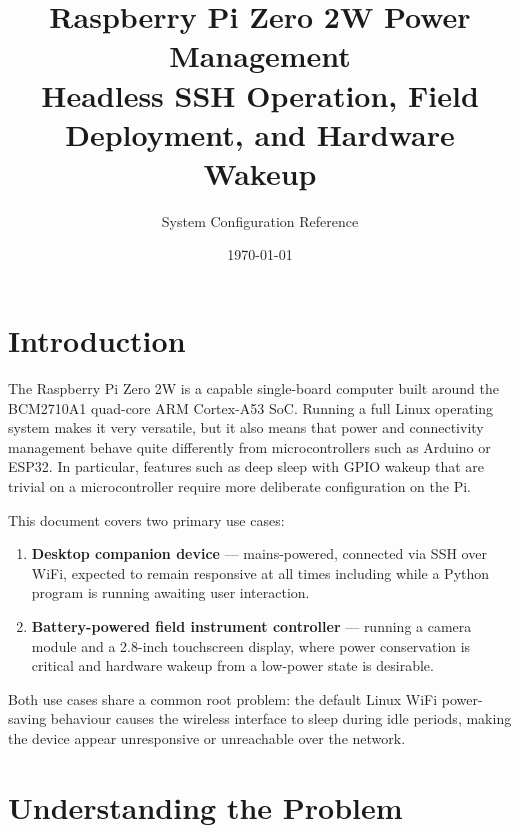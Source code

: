 \documentclass[11pt,letter]{article}
\begin{document}
\title{\textbf{Raspberry Pi Zero 2W Power Management}\\[0.4em]
\large Headless SSH Operation, Field Deployment, and Hardware Wakeup}
\author{System Configuration Reference}
\date{\today}
\maketitle
\thispagestyle{fancy}

\tableofcontents
\newpage

\section{Introduction}

The Raspberry Pi Zero 2W is a capable single-board computer built around the BCM2710A1 quad-core ARM Cortex-A53 SoC. Running a full Linux operating system makes it very versatile, but it also means that power and connectivity management behave quite differently from microcontrollers such as Arduino or ESP32. In particular, features such as deep sleep with GPIO wakeup that are trivial on a microcontroller require more deliberate configuration on the Pi.

This document covers two primary use cases:

\begin{enumerate}
  \item \textbf{Desktop companion device} --- mains-powered, connected via SSH over WiFi, expected to remain responsive at all times including while a Python program is running awaiting user interaction.
  \item \textbf{Battery-powered field instrument controller} --- running a camera module and a 2.8-inch touchscreen display, where power conservation is critical and hardware wakeup from a low-power state is desirable.
\end{enumerate}

Both use cases share a common root problem: the default Linux WiFi power-saving behaviour causes the wireless interface to sleep during idle periods, making the device appear unresponsive or unreachable over the network.

\section{Understanding the Problem}
\end{document}
